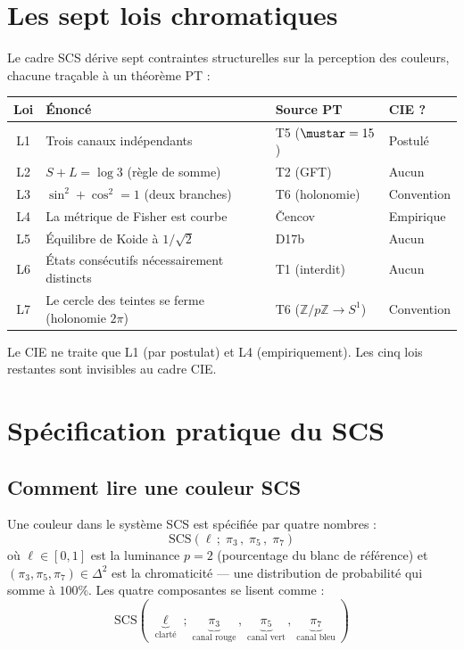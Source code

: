 \documentclass[12pt,a4paper]{article}
\begin{document}
\section{Les sept lois chromatiques}
\label{sec:laws}

Le cadre SCS d\'erive sept contraintes structurelles sur la perception
des couleurs, chacune tra\c{c}able \`a un th\'eor\`eme PT :

\begin{center}
\begin{tabular}{clll}
\toprule
\textbf{Loi} & \textbf{\'Enonc\'e} & \textbf{Source PT} & \textbf{CIE ?} \\
\midrule
L1 & Trois canaux ind\'ependants & T5 ($\mustar = 15$) & Postul\'e \\
L2 & $S + L = \log 3$ (r\`egle de somme) & T2 (GFT) & Aucun \\
L3 & $\sin^2 + \cos^2 = 1$ (deux branches) & T6 (holonomie) & Convention \\
L4 & La m\'etrique de Fisher est courbe & \v{C}encov & Empirique \\
L5 & \'Equilibre de Koide \`a $1/\sqrt{2}$ & D17b & Aucun \\
L6 & \'Etats cons\'ecutifs n\'ecessairement distincts & T1 (interdit) & Aucun \\
L7 & Le cercle des teintes se ferme (holonomie $2\pi$) & T6 ($\mathbb{Z}/p\mathbb{Z} \to S^1$) & Convention \\
\bottomrule
\end{tabular}
\end{center}

Le CIE ne traite que L1 (par postulat) et L4 (empiriquement). Les cinq
lois restantes sont invisibles au cadre CIE.

\section{Sp\'ecification pratique du SCS}
\label{sec:practical}

\subsection{Comment lire une couleur SCS}

Une couleur dans le syst\`eme SCS est sp\'ecifi\'ee par quatre nombres :
\begin{equation}
  \mathrm{SCS}(\ell\,;\; \pi_3\,,\; \pi_5\,,\; \pi_7)
\end{equation}
o\`u $\ell \in [0,1]$ est la luminance $p=2$ (pourcentage du blanc de
r\'ef\'erence) et $(\pi_3, \pi_5, \pi_7) \in \Delta^2$ est la
chromaticit\'e --- une distribution de probabilit\'e qui somme \`a
$100\%$. Les quatre composantes se lisent comme :
\[
  \mathrm{SCS}(\;\underbrace{\ell}_{\text{clart\'e}}\;;\;
  \underbrace{\pi_3}_{\text{canal rouge}}\,,\;
  \underbrace{\pi_5}_{\text{canal vert}}\,,\;
  \underbrace{\pi_7}_{\text{canal bleu}}\;)
\]
\end{document}
